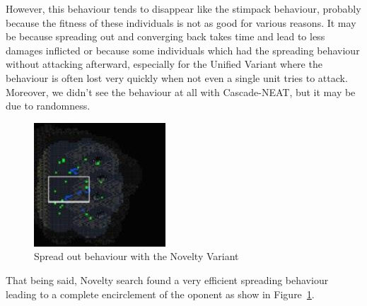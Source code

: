However, this behaviour tends to disappear like the stimpack behaviour,
probably because the fitness of these individuals is not as good for
various reasons.  It may be because spreading out and converging back
takes time and lead to less damages inflicted or because some
individuals which had the spreading behaviour without attacking
afterward, especially for the Unified Variant where the behaviour is
often lost very quickly when not even a single unit tries to attack.
Moreover, we didn't see the behaviour at all with Cascade-NEAT, but it
may be due to randomness.

\begin{figure}
    \includegraphics[width=.25\textwidth]{figures/spreading_behaviour_novelty}
    \caption{Spread out behaviour with the Novelty Variant}\label{fig:spreading-behaviour-novelty}
\end{figure}

That being said, Novelty search found a very efficient spreading
behaviour leading to a complete encirclement of the oponent as show in
Figure~\ref{fig:spreading-behaviour-novelty}.

